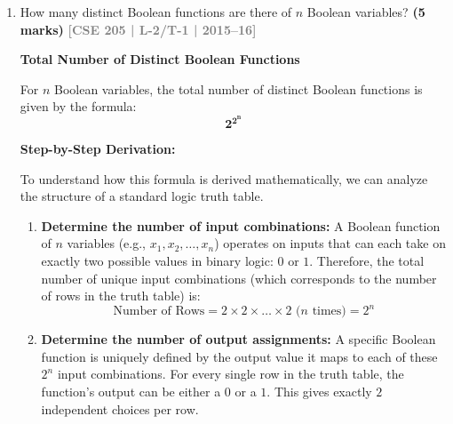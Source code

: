 \documentclass[12pt,a3paper]{article}
\newcommand{\yr}[1]{\hfill\textcolor{gray}{\small\textbf{[#1]}}}
\newcommand{\mk}[1]{\textcolor{orange!70!black}{\small\textbf{(#1 marks)}}}
\begin{document}
\begin{enumerate}
\begin{tcolorbox}[enhanced,breakable,ansbox,colback=cA!4,colframe=cA,boxrule=0.8pt,arc=5pt,title={\textbf{Answer}},fonttitle=\bfseries\color{white},colbacktitle=cA]
\vspace{0.2cm}
By comparing the last two columns of the truth table, we observe that the output values for the LHS $(x + y)(x' + z)(y + z)$ and the RHS $(x + y)(x' + z)$ are identical for every possible input combination of $x, y,$ and $z$. 

\textbf{Conclusion:} Both the rigorous algebraic derivation and the exhaustive truth table prove that the expression $(x + y)(x' + z)(y + z)$ accurately simplifies to $(x + y)(x' + z)$.
\end{tcolorbox}

\item How many distinct Boolean functions are there of $n$ Boolean variables?
\mk{5} \yr{CSE 205 | L-2/T-1 | 2015--16}

\begin{tcolorbox}[enhanced,breakable,ansbox,colback=cA!4,colframe=cA,boxrule=0.8pt,arc=5pt,title={\textbf{Answer}},fonttitle=\bfseries\color{white},colbacktitle=cA]

\textbf{Total Number of Distinct Boolean Functions}

For $n$ Boolean variables, the total number of distinct Boolean functions is given by the formula:
\[ \mathbf{2^{2^n}} \]

\vspace{0.3cm}
\textbf{Step-by-Step Derivation:}

To understand how this formula is derived mathematically, we can analyze the structure of a standard logic truth table.

\begin{enumerate}
    \item \textbf{Determine the number of input combinations:} 
    A Boolean function of $n$ variables (e.g., $x_1, x_2, \dots, x_n$) operates on inputs that can each take on exactly two possible values in binary logic: $0$ or $1$. Therefore, the total number of unique input combinations (which corresponds to the number of rows in the truth table) is:
    \[ \text{Number of Rows} = 2 \times 2 \times \dots \times 2 \text{ ($n$ times)} = 2^n \]
    
    \item \textbf{Determine the number of output assignments:}
    A specific Boolean function is uniquely defined by the output value it maps to each of these $2^n$ input combinations. For every single row in the truth table, the function's output can be either a $0$ or a $1$. This gives exactly $2$ independent choices per row.
    

\end{enumerate}
\end{tcolorbox}
\end{enumerate}
\end{document}
